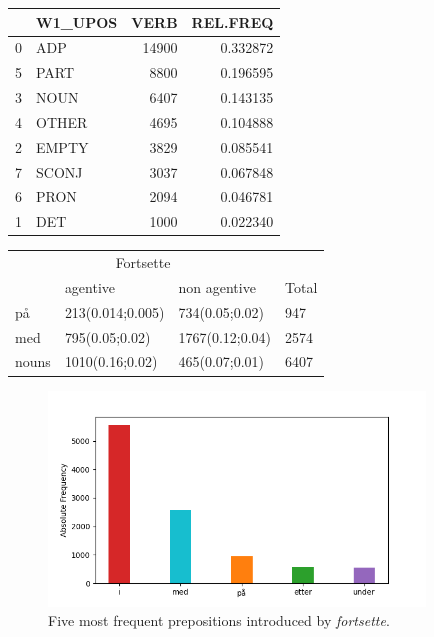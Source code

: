 \documentclass{article}
\begin{document}
\begin{minipage}{.3\textwidth}
  \centering
    \begin{tabular}{llrr}
    \toprule
    {} & W1\_UPOS &   VERB &  REL.FREQ \\
    \midrule
    0 &     ADP &  14900 &  0.332872 \\
    5 &    PART &   8800 &  0.196595 \\
    3 &    NOUN &   6407 &  0.143135 \\
    4 &   OTHER &   4695 &  0.104888 \\
    2 &   EMPTY &   3829 &  0.085541 \\
    7 &   SCONJ &   3037 &  0.067848 \\
    6 &    PRON &   2094 &  0.046781 \\
    1 &     DET &   1000 &  0.022340 \\
    \bottomrule
    \end{tabular}
\label{tab:fortsette_POS}
    \end{minipage}%
\hfill
\begin{minipage}{.5\textwidth}
  \centering
    \begin{tabular}{llll}
    \toprule
    \multicolumn{3}{c}{Fortsette}  \\
    
          & agentive & non agentive & Total\\
    \midrule    
    på    &  213(0.014;0.005)        &  734(0.05;0.02)  & 947         \\
    med   & 795(0.05;0.02)  & 1767(0.12;0.04) & 2574          \\
    nouns &  1010(0.16;0.02)         &  465(0.07;0.01)     & 6407     
    \end{tabular}
 \label{tab:fortsette_agentive}
\end{minipage}
\begin{figure}[htp]
    \centering
    \includegraphics[width=10cm]{pics/barplot_adp_fortsette.png}
    \caption{Five most frequent prepositions introduced by \emph{fortsette}.}
    \label{fig:barplot_pos_fortsette}
\end{figure}
\end{document}
